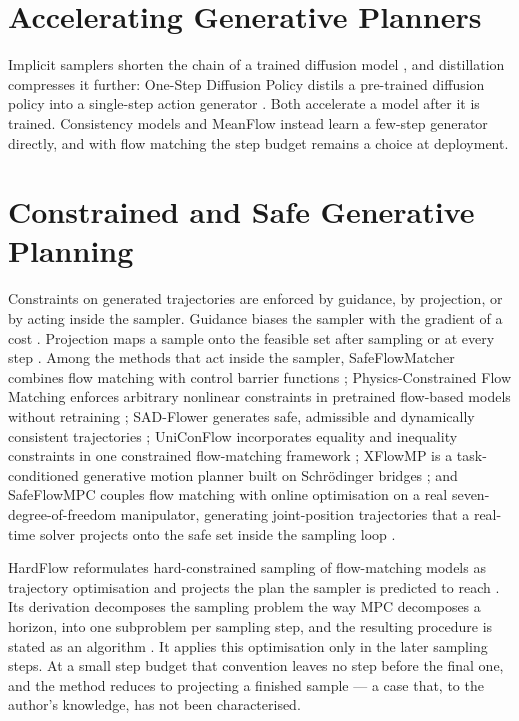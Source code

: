 \documentclass[headsepline,footsepline,footinclude=false,oneside,fontsize=11pt,paper=a4,listof=totoc,bibliography=totoc]{scrbook}
\theoremstyle{definition}
\theoremstyle{plain}
\theoremstyle{remark}
\begin{document}
\section{Accelerating Generative Planners}\label{sec:rel:accel}

Implicit samplers shorten the chain of a trained diffusion model \parencite{song2021denoising}, and
distillation compresses it further: One-Step Diffusion Policy distils a pre-trained diffusion policy
into a single-step action generator \parencite{wang2024onedp}. Both accelerate a model after it is
trained. Consistency models \parencite{song2023consistency} and MeanFlow \parencite{geng2025meanflow}
instead learn a few-step generator directly, and with flow matching the step budget remains a choice at
deployment.

\section{Constrained and Safe Generative Planning}\label{sec:rel:safety}

Constraints on generated trajectories are enforced by guidance, by projection, or by acting inside the
sampler. Guidance biases the sampler with the gradient of a cost \parencite{carvalho2025motion}.
Projection maps a sample onto the feasible set after sampling \parencite{power2023sampling} or at every
step \parencite{christopher2024constrained,romer2025diffusion}. Among the methods that act inside the
sampler, SafeFlowMatcher combines flow matching with control barrier functions
\parencite{yang2025safeflowmatcher}; Physics-Constrained Flow Matching enforces arbitrary nonlinear
constraints in pretrained flow-based models without retraining \parencite{utkarsh2025pcfm}; SAD-Flower
generates safe, admissible and dynamically consistent trajectories \parencite{huang2025sadflower};
UniConFlow incorporates equality and inequality constraints in one constrained flow-matching framework
\parencite{yang2025uniconflow}; XFlowMP is a task-conditioned generative motion planner built on
Schr\"odinger bridges \parencite{nguyen2025xflowmp}; and SafeFlowMPC couples flow matching with online
optimisation on a real seven-degree-of-freedom manipulator, generating joint-position trajectories
that a real-time solver projects onto the safe set inside the sampling loop
\parencite[Sec.~III]{oelerich2026safeflowmpc}.

HardFlow reformulates hard-constrained sampling of flow-matching models as trajectory optimisation and
projects the plan the sampler is predicted to reach \parencite{li2025hardflow}. Its derivation
decomposes the sampling problem the way \ac{MPC} decomposes a horizon, into one subproblem per
sampling step, and the resulting procedure is stated as an algorithm
\parencite[Alg.~1]{li2025hardflow}. It applies this optimisation only in the later sampling steps. At
a small step budget that convention leaves no step before the final one, and the method reduces to
projecting a finished sample --- a case that, to the author's knowledge, has not been characterised.
\end{document}
